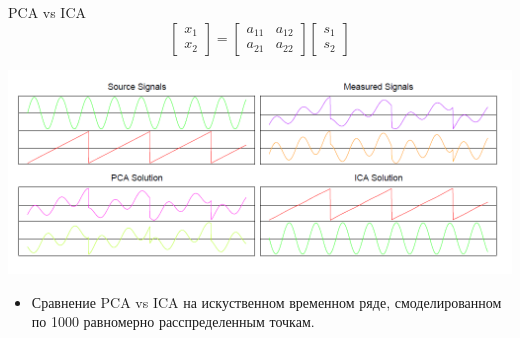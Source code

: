 \documentclass[10pt]{beamer}
\begin{document}
\begin{frame}{PCA vs ICA}
\[
    \left[ \begin{array}{c}
            x_1 \\
            x_2
            \end{array}
                \right] = 
    \left[
        \begin{array}{cc}
            a_{11} & a_{12} \\
            a_{21} & a_{22}
        \end{array}
    \right]
    \left[ \begin{array}{c}
            s_1 \\
            s_2
        \end{array}
    \right]
\]
\begin{center}
    \includegraphics[scale=0.3]{images/pcavsica.png}
\end{center}

\begin{itemize}
    \item Сравнение PCA vs ICA на искуственном временном ряде,
            смоделированном по 1000 равномерно расспределенным точкам.
\end{itemize}
\end{frame}
\end{document}
